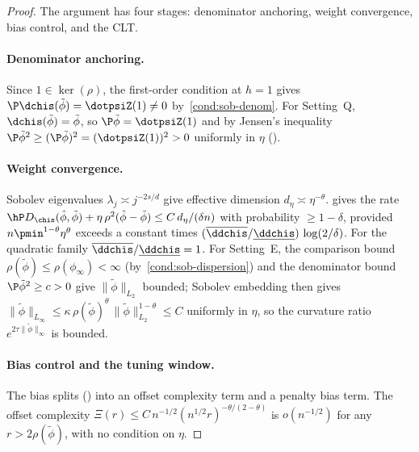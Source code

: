 \documentclass{article}
\begin{document}
\begin{proof}
The argument has four stages:
denominator anchoring,
weight convergence,
bias control, and the CLT\@.

\paragraph{Denominator anchoring.}
Since $1 \in \ker(\rho)$,
the first-order condition at $h = 1$ gives
$\P\dchis(\tilde\phi) = \dotpsiZ(1) \neq 0$
by~\ref{cond:sob-denom}.
For Setting~Q,
$\dchis(\tilde\phi) = \tilde\phi$,
so $\P\tilde\phi = \dotpsiZ(1)$
and by Jensen's inequality
$\P\tilde\phi^2 \ge (\P\tilde\phi)^2
  = (\dotpsiZ(1))^2 > 0$
uniformly in $\eta$
().

\paragraph{Weight convergence.}
Sobolev eigenvalues $\lambda_j \asymp j^{-2s/d}$
give effective dimension
$d_\eta \asymp \eta^{-\theta}$.
 gives the rate
$\hP D_{\chis}(\hat\phi, \tilde\phi)
  + \eta\,\rho^2(\hat\phi - \tilde\phi)
  \le C\,d_\eta/(\delta n)$
with probability $\ge 1 - \delta$,
provided $n\pmin^{1-\theta}\eta^\theta$
exceeds a constant
times $(\overline{\ddchis}/\underline{\ddchis})\,
  \log(2/\delta)$.
For the quadratic family
$\overline{\ddchis}/\underline{\ddchis} = 1$.
For Setting~E,
the comparison bound
$\rho(\tilde\phi) \le \rho(\phi_\infty) < \infty$
(by~\ref{cond:sob-dispersion})
and the denominator bound
$\P\tilde\phi^2 \ge c > 0$
give $\|\tilde\phi\|_{L_2}$ bounded;
Sobolev embedding then gives
$\|\tilde\phi\|_{L_\infty}
  \le \kappa\,\rho(\tilde\phi)^\theta\,
  \|\tilde\phi\|_{L_2}^{1-\theta}
  \le C$
uniformly in $\eta$,
so the curvature ratio
$e^{2\tau\|\tilde\phi\|_\infty}$ is bounded.

\paragraph{Bias control and the tuning window.}
The bias splits
()
into an offset complexity term
and a penalty bias term.
The offset complexity
$\Xi(r) \le C\, n^{-1/2}
  (n^{1/2} r)^{-\theta/(2-\theta)}$
is $o(n^{-1/2})$ for any $r > 2\rho(\tilde\phi)$,
with no condition on $\eta$.


\end{proof}
\end{document}
